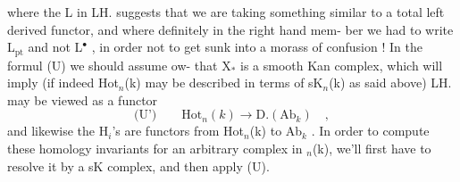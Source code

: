 
where the L in LH. suggests that we are taking something similar to a
total left derived functor, and where definitely in the right hand mem-%
ber we had to write L$_{\mathrm{pt}}$ and not L$^{\bullet}$ , in order not to  get sunk
into a morass of confusion ! In the formul (U) we should assume ow-
 that X$_{*}$ is a smooth Kan complex, which will imply (if indeed 
Hot$_n$(k) may be described in terms of sK$_n$(k) as said above)  LH.
may be viewed as a functor
\[ \text{(U')} \qquad \mathrm{Hot}_n(k) \longrightarrow \mathrm{D.}(\mathrm{Ab}_k) \quad , \]
and likewise the H$_i$'s are functors from Hot$_n$(k) to Ab$_k$ . In order to
compute these homology invariants for an arbitrary complex in $_n$(k),
we'll first have to resolve it by a sK complex, and then apply (U).

